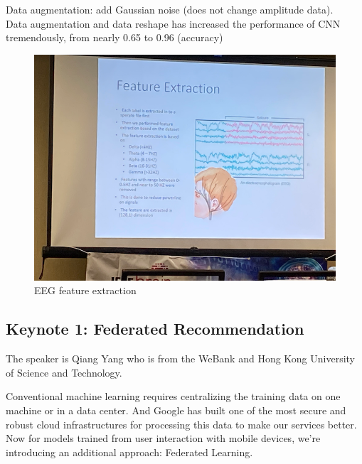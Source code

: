 Data augmentation: add Gaussian noise (does not change amplitude data).\\

Data augmentation and  data  reshape has increased  the performance of  CNN tremendously, from nearly 0.65 to 0.96 (accuracy)\\

\begin{figure}[ht!]
    \centering
    \includegraphics[width=120mm]{images/eeg.png}
    \caption{EEG feature extraction}
    \label{fig:eeg}
\end{figure}

\spacerule

\subsection{Keynote 1: Federated Recommendation}

\label{section: keynote1}

The speaker is Qiang Yang who is from the WeBank and Hong Kong University of Science and Technology.\\



Conventional machine learning requires centralizing the training data on one machine or in a data center. And Google has built one of the most secure and robust cloud infrastructures for processing this data to make our services better. Now for models trained from user interaction with mobile devices, we're introducing an additional approach: Federated Learning. 


